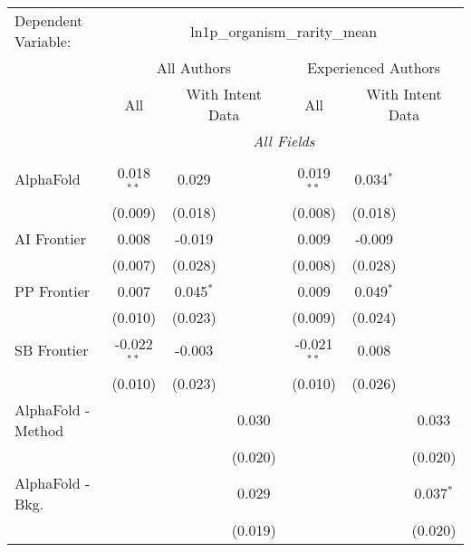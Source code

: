 \begingroup
\centering
\begin{tabular}{lcccccc}
   \tabularnewline \midrule \midrule
   Dependent Variable: & \multicolumn{6}{c}{ln1p\_organism\_rarity\_mean}\\
 & \multicolumn{3}{c}{All Authors} & \multicolumn{3}{c}{Experienced Authors} \\
\cmidrule(lr){2-4} \cmidrule(lr){5-7}
 & \multicolumn{1}{c}{All} & \multicolumn{2}{c}{With Intent Data} & \multicolumn{1}{c}{All} & \multicolumn{2}{c}{With Intent Data} \\
\cmidrule(lr){2-2} \cmidrule(lr){3-4} \cmidrule(lr){5-5} \cmidrule(lr){6-7}
 & \multicolumn{6}{c}{\textit{All Fields}} \\ \\
   AlphaFold            & 0.018$^{**}$  & 0.029       &               & 0.019$^{**}$  & 0.034$^{*}$ &   \\   
                        & (0.009)       & (0.018)     &               & (0.008)       & (0.018)     &   \\   
   AI Frontier          & 0.008         & -0.019      &               & 0.009         & -0.009      &   \\   
                        & (0.007)       & (0.028)     &               & (0.008)       & (0.028)     &   \\   
   PP Frontier          & 0.007         & 0.045$^{*}$ &               & 0.009         & 0.049$^{*}$ &   \\   
                        & (0.010)       & (0.023)     &               & (0.009)       & (0.024)     &   \\   
   SB Frontier          & -0.022$^{**}$ & -0.003      &               & -0.021$^{**}$ & 0.008       &   \\   
                        & (0.010)       & (0.023)     &               & (0.010)       & (0.026)     &   \\   
   AlphaFold - Method   &               &             & 0.030         &               &             & 0.033\\   
                        &               &             & (0.020)       &               &             & (0.020)\\   
   AlphaFold - Bkg.     &               &             & 0.029         &               &             & 0.037$^{*}$\\   
                        &               &             & (0.019)       &               &             & (0.020)\\   

\end{tabular}
